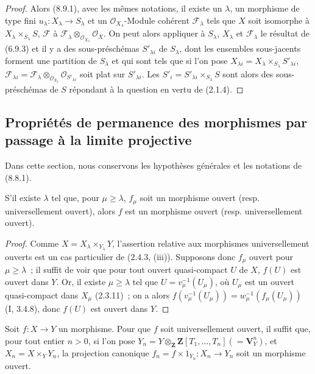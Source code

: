 \begin{proof}
Alors (8.9.1), avec les mêmes notations, il existe un $\lambda$, un morphisme
de type fini $u_\lambda:X_\lambda\to S_\lambda$ et un
$\mathcal O_{X_\lambda}$-Module cohérent $\mathcal F_\lambda$ tels que $X$
soit isomorphe à $X_\lambda\times_{S_\lambda}S$, $\mathcal F$ à
$\mathcal F_\lambda\otimes_{\mathcal O_{X_\lambda}}\mathcal O_X$. On peut
alors appliquer à $S_\lambda$, $X_\lambda$ et $\mathcal F_\lambda$ le
résultat de (6.9.3) et il y a des sous-préschémas $S'_{\lambda i}$ de
$S_\lambda$, dont les ensembles sous-jacents forment une partition de
$S_\lambda$ et qui sont tels que si l'on pose
$X_{\lambda i}=X_\lambda\times_{S_\lambda}S'_{\lambda i}$,
$\mathcal F_{\lambda i}=\mathcal F_\lambda\otimes_{\mathcal O_{S_\lambda}}
\mathcal O_{S'_{\lambda i}}$ soit plat sur $S'_{\lambda i}$. Les
$S'_i=S'_{\lambda i}\times_{S_\lambda}S$ sont alors des sous-préschémas de
$S$ répondant à la question en vertu de (2.1.4).
\end{proof}

\subsection{Propriétés de permanence des morphismes par passage à la limite projective}
\label{subsection:IV.8.10-fr}

Dans cette section, nous conservons les hypothèses générales et les notations
de (8.8.1).

\begin{proposition}[8.10.1]
\label{IV.8.10.1-fr}
S'il existe $\lambda$ tel que, pour $\mu\geq\lambda$, $f_\mu$ soit un morphisme
ouvert (resp. universellement ouvert), alors $f$ est un morphisme ouvert
(resp. universellement ouvert).
\end{proposition}

\begin{proof}
Comme $X=X_\lambda\times_{Y_\lambda}Y$, l'assertion relative aux morphismes
universellement ouverts est un cas particulier de (2.4.3, (iii)). Supposons
donc $f_\mu$ ouvert pour $\mu\geq\lambda$~; il suffit de voir que pour tout
ouvert quasi-compact $U$ de $X$, $f(U)$ est ouvert dans $Y$. Or, il existe
$\mu\geq\lambda$ tel que $U=v_\mu^{-1}(U_\mu)$, où $U_\mu$ est un ouvert
quasi-compact dans $X_\mu$ (2.3.11)~; on a alors
$f(v_\mu^{-1}(U_\mu))=w_\mu^{-1}(f_\mu(U_\mu))$ (I, 3.4.8), donc $f(U)$ est
ouvert dans $Y$.
\end{proof}

\begin{corollary}[8.10.2]
\label{IV.8.10.2-fr}
Soit $f:X\to Y$ un morphisme. Pour que $f$ soit universellement ouvert, il
suffit que, pour tout entier $n>0$, si l'on pose
$Y_n=Y\otimes_{\mathbf Z}\mathbf Z[T_1,\ldots,T_n](=\mathbf V_Y^n)$, et
$X_n=X\times_YY_n$, la projection canonique
$f_n=f\times1_{Y_n}:X_n\to Y_n$ soit un morphisme ouvert.
\end{corollary}

